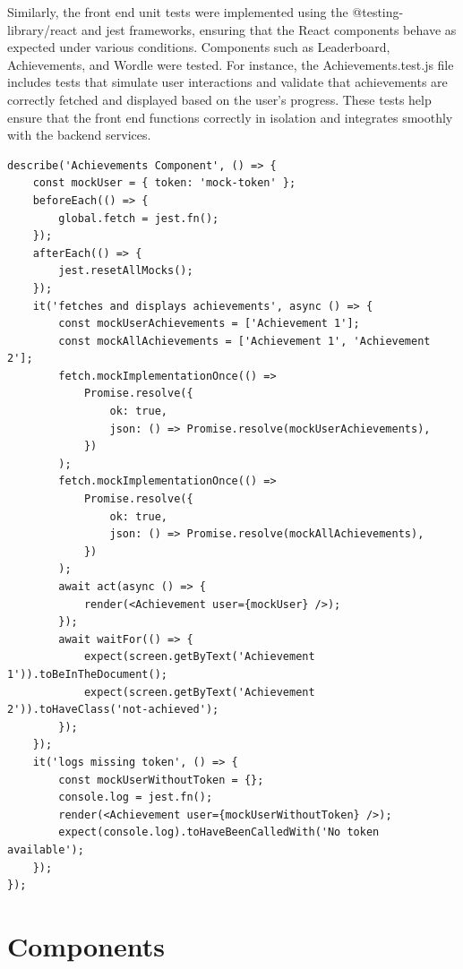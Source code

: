 Similarly, the front end unit tests were implemented using the @testing-library/react and jest frameworks, ensuring that the React components behave as expected under various conditions. Components such as Leaderboard, Achievements, and Wordle were tested. For instance, the Achievements.test.js file includes tests that simulate user interactions and validate that achievements are correctly fetched and displayed based on the user's progress. These tests help ensure that the front end functions correctly in isolation and integrates smoothly with the backend services.

\begin{lstlisting}[style=python, caption={Achievement frontend unit testing}]
describe('Achievements Component', () => {
    const mockUser = { token: 'mock-token' };
    beforeEach(() => {
        global.fetch = jest.fn();
    });
    afterEach(() => {
        jest.resetAllMocks();
    });
    it('fetches and displays achievements', async () => {
        const mockUserAchievements = ['Achievement 1'];
        const mockAllAchievements = ['Achievement 1', 'Achievement 2'];
        fetch.mockImplementationOnce(() =>
            Promise.resolve({
                ok: true,
                json: () => Promise.resolve(mockUserAchievements),
            })
        );
        fetch.mockImplementationOnce(() =>
            Promise.resolve({
                ok: true,
                json: () => Promise.resolve(mockAllAchievements),
            })
        );
        await act(async () => {
            render(<Achievement user={mockUser} />);
        });
        await waitFor(() => {
            expect(screen.getByText('Achievement 1')).toBeInTheDocument();
            expect(screen.getByText('Achievement 2')).toHaveClass('not-achieved');
        });
    });
    it('logs missing token', () => {
        const mockUserWithoutToken = {};
        console.log = jest.fn();
        render(<Achievement user={mockUserWithoutToken} />);
        expect(console.log).toHaveBeenCalledWith('No token available');
    });
});
\end{lstlisting}

\section{Components}
